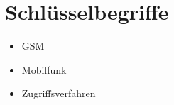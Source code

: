 \section*{Schlüsselbegriffe}

\begin{itemize}
	\setlength{\itemsep}{0pt}
	\item[] GSM
	\item[] Mobilfunk
	\item[] Zugriffsverfahren
\end{itemize}

